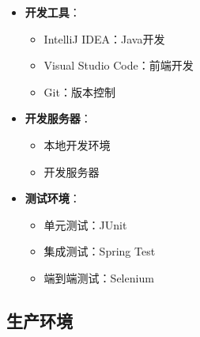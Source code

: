 \documentclass[a4paper,12pt]{article}
\begin{document}
\begin{itemize}
  \item \textbf{开发工具}：
    \begin{itemize}
      \item IntelliJ IDEA：Java开发
      \item Visual Studio Code：前端开发
      \item Git：版本控制
    \end{itemize}
  
  \item \textbf{开发服务器}：
    \begin{itemize}
      \item 本地开发环境
      \item 开发服务器
    \end{itemize}
  
  \item \textbf{测试环境}：
    \begin{itemize}
      \item 单元测试：JUnit
      \item 集成测试：Spring Test
      \item 端到端测试：Selenium
    \end{itemize}
\end{itemize}

\subsection{生产环境}
\end{document}
